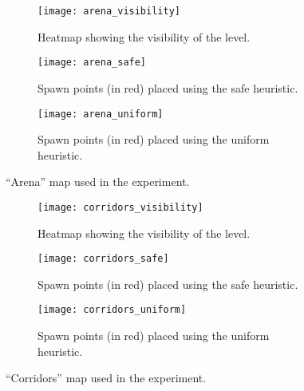 \begin{figure}[tp]
	\centering
	\begin{subfigure}[t]{0.3\linewidth}
    		\texttt{[image: arena\_visibility]}
     		\caption{Heatmap showing the visibility of the level.}
		\label{img:arena_visibility}
  	\end{subfigure}  	
  	\hfil
  	\begin{subfigure}[t]{0.3\linewidth}
    		\texttt{[image: arena\_safe]}
     		\caption{Spawn points (in red) placed using the safe heuristic.}
     		\label{img:arena_safe}
  	\end{subfigure}
  	\hfil
  	\begin{subfigure}[t]{0.3\linewidth}
    		\texttt{[image: arena\_uniform]}
     		\caption{Spawn points (in red) placed using the uniform heuristic.}
		\label{img:arena_uniform}
  	\end{subfigure}  
	\caption{``Arena'' map used in the experiment.}
\end{figure}

\begin{figure}[tp]
	\centering
  	\begin{subfigure}[t]{0.3\linewidth}
    		\texttt{[image: corridors\_visibility]}
     		\caption{Heatmap showing the visibility of the level.}
		\label{img:corridors_visibility}
  	\end{subfigure}  	  
  	\hfil
  	\begin{subfigure}[t]{0.3\linewidth}
    		\texttt{[image: corridors\_safe]}
     		\caption{Spawn points (in red) placed using the safe heuristic.}
     		\label{img:corridors_safe}
  	\end{subfigure}
  	\hfil
  	\begin{subfigure}[t]{0.3\linewidth}
    		\texttt{[image: corridors\_uniform]}
     		\caption{Spawn points (in red) placed using the uniform heuristic.}
		\label{img:corridors_uniform}
  	\end{subfigure}	
	\caption{``Corridors'' map used in the experiment.}
\end{figure}

